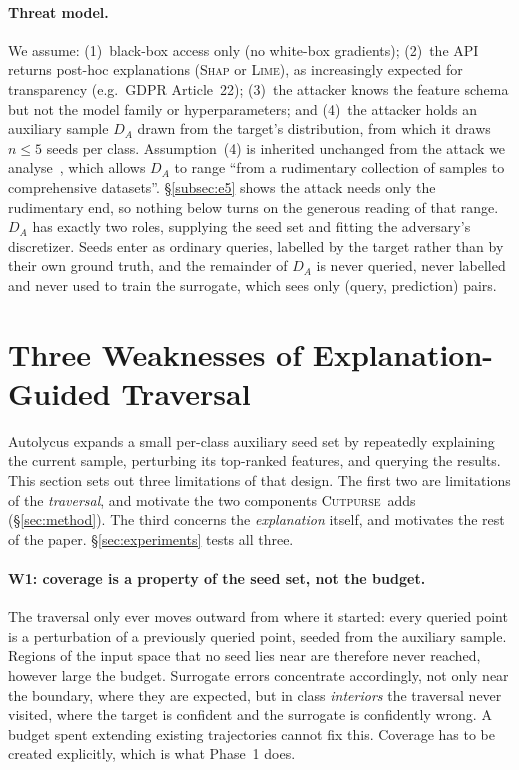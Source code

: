 \documentclass[sigconf,anonymous,review]{acmart}
\newcommand{\sys}{\textsc{Cutpurse}}
\begin{document}
\paragraph{Threat model.}
We assume: (1)~black-box access only (no white-box gradients); (2)~the API returns
post-hoc explanations (\textsc{Shap} or \textsc{Lime}), as increasingly expected for
transparency (e.g.\ GDPR Article~22); (3)~the attacker knows the feature schema but
not the model family or hyperparameters; and (4)~the attacker holds an auxiliary
sample $D_A$ drawn from the target's distribution, from which it draws $n{\le}5$ seeds per
class. Assumption~(4) is inherited unchanged from the attack we analyse~\cite{oksuz2024autolycus},
which allows $D_A$ to range ``from a rudimentary collection of samples to comprehensive datasets''.
\S\ref{subsec:e5} shows the attack needs only the rudimentary end, so nothing below turns on the
generous reading of that range. $D_A$ has exactly two roles, supplying the seed set and fitting the adversary's
discretizer. Seeds enter as ordinary queries, labelled by the target rather than by their own ground
truth, and the remainder of $D_A$ is never queried, never labelled and never used to train the
surrogate, which sees only (query, prediction) pairs.

\section{Three Weaknesses of Explanation-Guided Traversal}
\label{sec:analysis}
Autolycus expands a small per-class auxiliary seed set by repeatedly explaining the current sample,
perturbing its top-ranked features, and querying the results. This section sets out three limitations
of that design. The first two are limitations of the \emph{traversal}, and motivate the two components
\sys\ adds (\S\ref{sec:method}). The third concerns the \emph{explanation} itself, and motivates the
rest of the paper. \S\ref{sec:experiments} tests all three.

\paragraph{W1: coverage is a property of the seed set, not the budget.}
The traversal only ever moves outward from where it started: every queried point is a perturbation of
a previously queried point, seeded from the auxiliary sample. Regions of the input space that no seed
lies near are therefore never reached, however large the budget. Surrogate errors concentrate accordingly, not only near the boundary, where they are expected, but in class \emph{interiors} the
traversal never visited, where the target is confident and the surrogate is confidently wrong. A
budget spent extending existing trajectories cannot fix this. Coverage has to be created explicitly,
which is what Phase~1 does.
\end{document}
